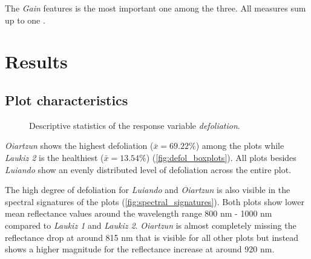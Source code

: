 \documentclass[review]{elsarticle}
\begin{document}
\noindent The \textit{Gain} features is the most important one among the three.
All measures sum up to one \citep{chenXGBoostScalableTree2016}.


\section{Results}

\subsection{Plot characteristics}

\begin{figure} [t!]
	\begin{center}
		\caption{Descriptive statistics of the response variable \textit{defoliation}.}
		\label{fig:defol_boxplots}
	\end{center}
\end{figure}

\noindent \textit{Oiartzun} shows the highest defoliation ($\bar{x} = 69.22 \%$) among the plots while \textit{Laukiz 2} is the healthiest ($\bar{x} = 13.54 \%$) (\autoref{fig:defol_boxplots}).
All plots besides \textit{Luiando} show an evenly distributed level of defoliation across the entire plot.

\noindent The high degree of defoliation for \textit{Luiando} and \textit{Oiartzun} is also visible in the spectral signatures of the plots (\autoref{fig:spectral_signatures}).
Both plots show lower mean reflectance values around the wavelength range 800 nm - 1000 nm compared to \textit{Laukiz 1} and \textit{Laukiz 2}.
\textit{Oiartzun} is almost completely missing the reflectance drop at around 815 nm that is visible for all other plots but instead shows a higher magnitude for the reflectance increase at around 920 nm.
\end{document}
